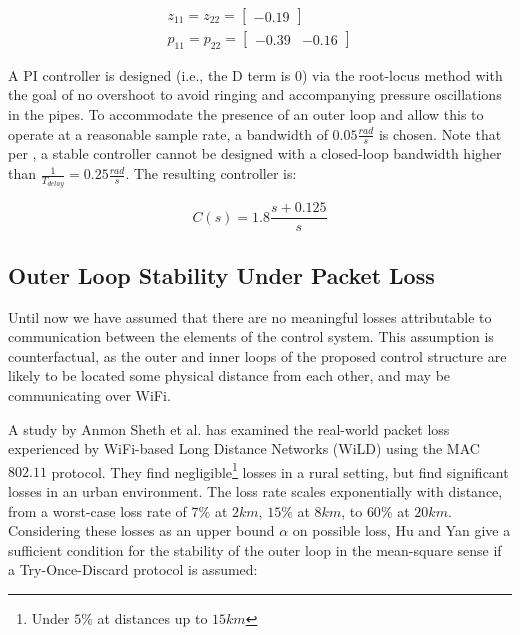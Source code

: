 \begin{equation}\label{eq:PumpTFSimple}
	\begin{gathered}
		z_{11} = z_{22} = \begin{bmatrix}-0.19\end{bmatrix} \\
		p_{11} = p_{22} = \begin{bmatrix}-0.39 & -0.16 \end{bmatrix}
	\end{gathered}
\end{equation}

A PI controller is designed (i.e., the D term is $0$) via the root-locus method with the goal of no overshoot to avoid ringing and accompanying pressure oscillations in the pipes. To accommodate the presence of an outer loop and allow this to operate at a reasonable sample rate, a bandwidth of $0.05 \frac{\si{rad}}{\si{s}}$ is chosen. Note that per \cite{Skogestad2005}, a stable controller cannot be designed with a closed-loop bandwidth higher than $\frac{1}{T_{delay}} = 0.25 \frac{\si{rad}}{\si{s}}$. The resulting controller is:

\begin{equation}\label{eq:PIDTransferFunction}
	C(s) = 1.8\frac{s+0.125}{s}
\end{equation}

\subsection{Outer Loop Stability Under Packet Loss}\label{subsec:PacketLossStability}

Until now we have assumed that there are no meaningful losses attributable to communication between the elements of the control system. This assumption is counterfactual, as the outer and inner loops of the proposed control structure are likely to be located some physical distance from each other, and may be communicating over WiFi.

A study by Anmon Sheth et al. \cite{Sheth2007} has examined the real-world packet loss experienced by WiFi-based Long Distance Networks (WiLD) using the MAC $802.11$ protocol. They find negligible\footnote{Under $5\%$ at distances up to $15 \si{km}$} losses in a rural setting, but find significant losses in an urban environment. The loss rate scales exponentially with distance, from a worst-case loss rate of $7\%$ at $2\si{km}$, $15\%$ at $8\si{km}$, to $60\%$ at $20\si{km}$. Considering these losses as an upper bound $\alpha$ on possible loss, Hu and Yan \cite{Hu2007} give a sufficient condition for the stability of the outer loop in the mean-square sense if a Try-Once-Discard protocol is assumed:

